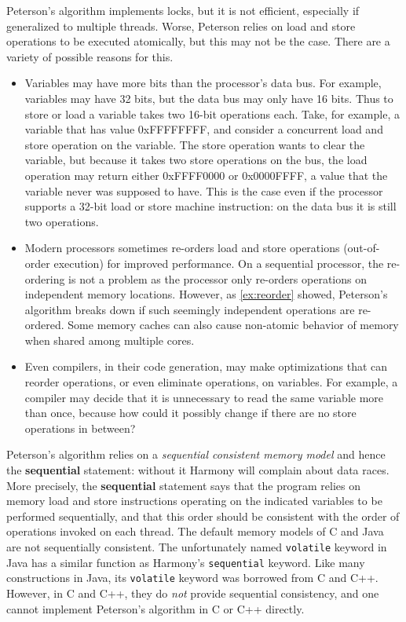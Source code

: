 \documentclass{report}
\begin{document}
Peterson's algorithm implements locks, but it is not efficient,
especially if generalized to multiple threads.
Worse, Peterson relies on load and store operations to be executed
atomically, but this may not be the case.
There are a variety of possible reasons for this.

\begin{itemize}
\item Variables may have more bits than the processor's data bus.
For example, variables may have 32 bits, but the data bus may only
have 16 bits.  Thus to store or load a variable takes two 16-bit
operations each.  Take, for example, a variable that has value
0xFFFFFFFF, and consider a concurrent load and store operation on
the variable.
The store operation wants to clear the variable, but because it
takes two store operations on the bus, the load operation may
return either 0xFFFF0000 or 0x0000FFFF, a value that the variable
never was supposed to have.
This is the case even if the processor supports a 32-bit load or
store machine instruction: on the data bus it is still two
operations.
\item Modern processors sometimes re-orders load and store operations
(out-of-order execution) for improved performance.  On a sequential processor,
the re-ordering is not a problem as the processor only re-orders
operations on independent memory locations.  However, as \autoref{ex:reorder}
showed, Peterson's algorithm breaks down if such seemingly independent
operations are re-ordered.
Some memory caches can also cause non-atomic behavior of memory when shared
among multiple cores.
\item Even compilers, in their code generation, may make optimizations
that can reorder operations, or even eliminate operations, on variables.
For example, a compiler may decide that it is unnecessary to read the same
variable more than once, because how could it possibly change if there
are no store operations in between?
\end{itemize}

Peterson's algorithm relies on a \emph{sequential consistent memory model}
and hence the \textbf{sequential} statement: without it Harmony will
complain about data races.
More precisely, the \textbf{sequential} statement says that the
program relies on memory load and store instructions operating on
the indicated variables to be performed sequentially, and that this
order should be consistent with the order of operations invoked on each
thread.
The default memory models of C and Java are not sequentially
consistent.
The unfortunately named \texttt{volatile} keyword in Java has
a similar function as Harmony's \texttt{sequential} keyword.
Like many constructions in Java, its \texttt{volatile} keyword
was borrowed from C and C++.
However, in C and C++, they do \emph{not} provide sequential
consistency, and one cannot implement Peterson's algorithm in
C or C++ directly.
\end{document}
